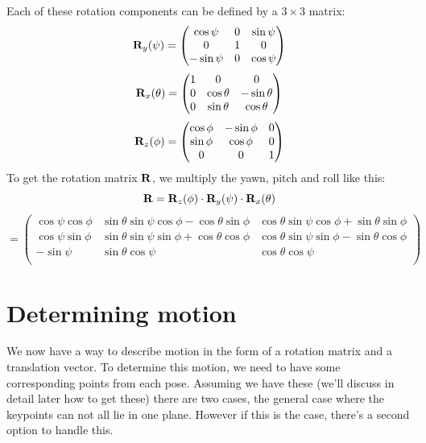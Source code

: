 Each of these rotation components can be defined by a $3\times3$ matrix:
\begin{equation}
    \mathbf{R}_y(\psi) = \begin{pmatrix}
        \cos\psi & 0 & \sin\psi \\
        0 & 1 & 0 \\
        -\sin\psi & 0 & \cos\psi
    \end{pmatrix}
\end{equation}
\begin{equation}
    \mathbf{R}_x(\theta) = \begin{pmatrix}
        1 & 0 & 0 \\
        0 & \cos\theta & -\sin\theta \\
        0 & \sin\theta & \cos\theta \\
    \end{pmatrix}
\end{equation}
\begin{equation}
    \mathbf{R}_z(\phi) = \begin{pmatrix}
        \cos\phi & -\sin\phi & 0 \\
        \sin\phi & \cos\phi & 0 \\
        0 & 0 & 1
    \end{pmatrix}
\end{equation}
To get the rotation matrix $\mathbf{R}$, we multiply the yawn, pitch and roll like this:
\begin{equation}
    \mathbf{R} = \mathbf{R}_z(\phi)\cdot\mathbf{R}_y(\psi)\cdot\mathbf{R}_x(\theta)
\end{equation}
\begin{equation*}
    = \begin{pmatrix}
    \cos\psi\cos\phi & \sin\theta\sin\psi\cos\phi - \cos\theta\sin\phi & \cos\theta\sin\psi\cos\phi + \sin\theta\sin\phi \\
    \cos\psi\sin\phi & \sin\theta\sin\psi\sin\phi + \cos\theta\cos\phi & \cos\theta\sin\psi\sin\phi - \sin\theta\cos\phi \\
    -\sin\psi          & \sin\theta\cos\psi                                  & \cos\theta\cos\psi \\
  \end{pmatrix} 
\end{equation*}

\section{Determining motion}
We now have a way to describe motion in the form of a rotation matrix and a translation vector. To determine this motion, we need to have some corresponding points from each pose. Assuming we have these (we'll discuss in detail later how to get these) there are two cases, the general case where the keypoints can not all lie in one plane. However if this is the case, there's a second option to handle this.

